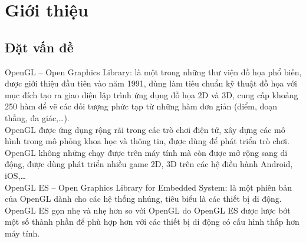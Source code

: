 \documentclass[13pt,a4paper]{extreport}
\begin{document}


\newpage 


\tableofcontents

\newpage

\listoffigures

\listoftables

\newpage

\chapter{Giới thiệu}
\section{Đặt vấn đề}
	OpenGL -- Open Graphics Library: là một trong những thư viện đồ họa phổ biến, được giới thiệu đầu tiên vào năm 1991, dùng làm tiêu chuẩn kỹ thuật đồ họa với mục đích tạo ra giao diện lập trình ứng dụng đồ họa 2D và 3D, cung cấp khoảng 250 hàm để vẽ các đối tượng phức tạp từ những hàm đơn giản (điểm, đoạn thẳng, đa giác,\ldots).\\
	
	OpenGL được ứng dụng rộng rãi trong các trò chơi điện tử, xây dựng các mô hình trong mô phỏng khoa học và thông tin, được dùng để phát triển trò chơi.\\
	
	OpenGL không những chạy được trên máy tính mà còn được mở rộng sang di động, được dùng phát triển nhiều game 2D, 3D trên các hệ điều hành Android, iOS,\ldots \\
	
	OpenGL ES -- Open Graphics Library for Embedded System: là một phiên bản của OpenGL dành cho các hệ thống nhúng, tiêu biểu là các thiết bị di động. OpenGL ES gọn nhẹ và nhẹ hơn so với OpenGL do OpenGL ES được lược bớt một số thành phần để phù hợp hơn với các thiết bị di động có cấu hình thấp hơn máy tính.\\
	
\end{document}

